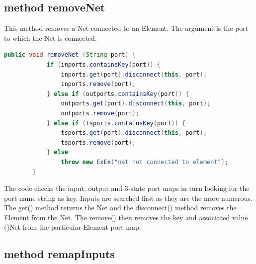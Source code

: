 \subsection{method removeNet}

    This method removes a Net connected to an Element. The argument
    is the port to which the Net is connected.
    \begin{lstlisting}[gobble=4, language=java]
        public void removeNet (String port) {
            if (inports.containsKey(port)) {
                inports.get(port).disconnect(this, port);
                inports.remove(port);
            } else if (outports.containsKey(port)) {
                outports.get(port).disconnect(this, port);
                outports.remove(port);
            } else if (tsports.containsKey(port)) {
                tsports.get(port).disconnect(this, port);
                tsports.remove(port);
            } else
                throw new ExEx("net not connected to element");
        }
    \end{lstlisting}
    The code checks the input, output and 3-state port maps in turn
    looking for the port name string as key. Inputs are searched first
    as they are the more numerous. The get() method returns the Net
    and the disconnect() method removes the Element from the Net.
    The remove() then removes the key and associated value ()Net from
    the particular Element port map.


\subsection{method remapInputs}

